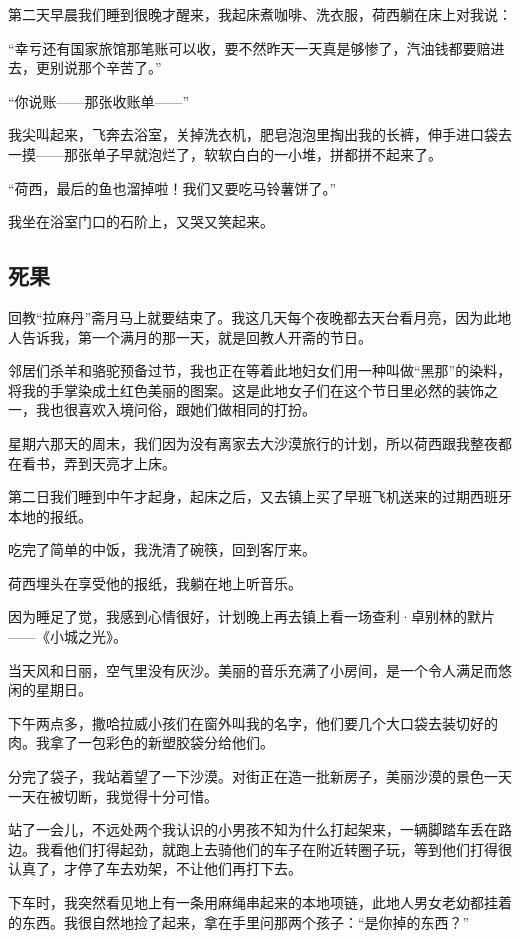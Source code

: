 \par 第二天早晨我们睡到很晚才醒来，我起床煮咖啡、洗衣服，荷西躺在床上对我说：
\par “幸亏还有国家旅馆那笔账可以收，要不然昨天一天真是够惨了，汽油钱都要赔进去，更别说那个辛苦了。”
\par “你说账——那张收账单——”
\par 我尖叫起来，飞奔去浴室，关掉洗衣机，肥皂泡泡里掏出我的长裤，伸手进口袋去一摸——那张单子早就泡烂了，软软白白的一小堆，拼都拼不起来了。
\par “荷西，最后的鱼也溜掉啦！我们又要吃马铃薯饼了。”
\par 我坐在浴室门口的石阶上，又哭又笑起来。


\subsection{死果}
\par 回教“拉麻丹”斋月马上就要结束了。我这几天每个夜晚都去天台看月亮，因为此地人告诉我，第一个满月的那一天，就是回教人开斋的节日。
\par 邻居们杀羊和骆驼预备过节，我也正在等着此地妇女们用一种叫做“黑那”的染料，将我的手掌染成土红色美丽的图案。这是此地女子们在这个节日里必然的装饰之一，我也很喜欢入境问俗，跟她们做相同的打扮。
\par 星期六那天的周末，我们因为没有离家去大沙漠旅行的计划，所以荷西跟我整夜都在看书，弄到天亮才上床。
\par 第二日我们睡到中午才起身，起床之后，又去镇上买了早班飞机送来的过期西班牙本地的报纸。
\par 吃完了简单的中饭，我洗清了碗筷，回到客厅来。
\par 荷西埋头在享受他的报纸，我躺在地上听音乐。
\par 因为睡足了觉，我感到心情很好，计划晚上再去镇上看一场查利·卓别林的默片——《小城之光》。
\par 当天风和日丽，空气里没有灰沙。美丽的音乐充满了小房间，是一个令人满足而悠闲的星期日。
\par 下午两点多，撒哈拉威小孩们在窗外叫我的名字，他们要几个大口袋去装切好的肉。我拿了一包彩色的新塑胶袋分给他们。
\par 分完了袋子，我站着望了一下沙漠。对街正在造一批新房子，美丽沙漠的景色一天一天在被切断，我觉得十分可惜。
\par 站了一会儿，不远处两个我认识的小男孩不知为什么打起架来，一辆脚踏车丢在路边。我看他们打得起劲，就跑上去骑他们的车子在附近转圈子玩，等到他们打得很认真了，才停了车去劝架，不让他们再打下去。
\par 下车时，我突然看见地上有一条用麻绳串起来的本地项链，此地人男女老幼都挂着的东西。我很自然地捡了起来，拿在手里问那两个孩子：“是你掉的东西？”
